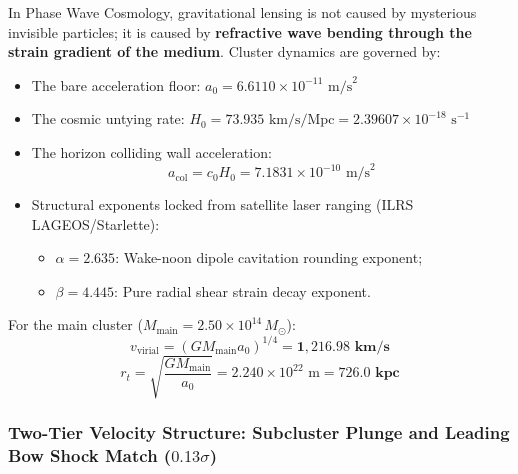 \documentclass[11pt,a4paper]{article}
\begin{document}
In Phase Wave Cosmology, gravitational lensing is not caused by mysterious invisible particles; it is caused by \textbf{refractive wave bending through the strain gradient of the medium}. Cluster dynamics are governed by:
\begin{itemize}
    \item The bare acceleration floor: $a_0 = 6.6110 \times 10^{-11}\text{ m/s}^2$
    \item The cosmic untying rate: $H_0 = 73.935\text{ km/s/Mpc} = 2.39607 \times 10^{-18}\text{ s}^{-1}$
    \item The horizon colliding wall acceleration:
    \begin{equation}
    a_{\text{col}} = c_0 H_0 = 7.1831 \times 10^{-10}\text{ m/s}^2
    \label{eq:a_col_def}
    \end{equation}
    \item Structural exponents locked from satellite laser ranging (ILRS LAGEOS/Starlette):
    \begin{itemize}
        \item $\alpha = 2.635$: Wake-noon dipole cavitation rounding exponent;
        \item $\beta = 4.445$: Pure radial shear strain decay exponent.
    \end{itemize}
\end{itemize}

For the main cluster ($M_{\text{main}} = 2.50 \times 10^{14}\,M_\odot$):
\begin{equation}
v_{\text{virial}} = (G M_{\text{main}} a_0)^{1/4} = \mathbf{1,216.98\text{ km/s}}
\end{equation}
\begin{equation}
r_t = \sqrt{\frac{G M_{\text{main}}}{a_0}} = 2.240 \times 10^{22}\text{ m} = \mathbf{726.0\text{ kpc}}
\end{equation}

\subsubsection{Two-Tier Velocity Structure: Subcluster Plunge and Leading Bow Shock Match ($0.13\sigma$)}
\label{subsubsec:bullet_velocities}
\end{document}
